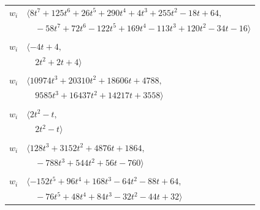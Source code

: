 \documentclass[11pt]{article}
\begin{document}
\begin{longtable}{@{}ll@{}}
$w_i$ & $\langle 8t^{7}+125t^{6}+26t^{5}+290t^{4}+4t^{3}+255t^{2}-18t+64,$\\
 & $\quad -58t^{7}+72t^{6}-122t^{5}+169t^{4}-113t^{3}+120t^{2}-34t-16\rangle$\\
\addlinespace[2pt]
\multicolumn{2}{@{}p{0.97\textwidth}@{}}{$i=44$, $D_i=2$, $\rho_{ij}$: $26{:}1, \allowbreak 36{:}1, \allowbreak 37{:}2, \allowbreak 43{:}2, \allowbreak 45{:}1, \allowbreak 48{:}1, \allowbreak 61{:}2$}\\
$w_i$ & $\langle -4t+4,$\\
 & $\quad 2t^{2}+2t+4\rangle$\\
\addlinespace[2pt]
\multicolumn{2}{@{}p{0.97\textwidth}@{}}{$i=45$, $D_i=32$, $\rho_{ij}$: $3{:}1, \allowbreak 7{:}2, \allowbreak 8{:}2, \allowbreak 14{:}1, \allowbreak 17{:}1, \allowbreak 24{:}1, \allowbreak 26{:}2, \allowbreak 27{:}2, \allowbreak 34{:}2, \allowbreak 40{:}2, \allowbreak 44{:}2, \allowbreak 59{:}1, \allowbreak 71{:}2, \allowbreak 72{:}2$}\\
$w_i$ & $\langle 10974t^{3}+20310t^{2}+18606t+4788,$\\
 & $\quad 9585t^{3}+16437t^{2}+14217t+3558\rangle$\\
\addlinespace[2pt]
\multicolumn{2}{@{}p{0.97\textwidth}@{}}{$i=46$, $D_i=1$, $\rho_{ij}$: $23{:}2, \allowbreak 38{:}1$}\\
$w_i$ & $\langle 2t^{2}-t,$\\
 & $\quad 2t^{2}-t\rangle$\\
\addlinespace[2pt]
\multicolumn{2}{@{}p{0.97\textwidth}@{}}{$i=47$, $D_i=4$, $\rho_{ij}$: $1{:}2, \allowbreak 4{:}1, \allowbreak 10{:}2, \allowbreak 13{:}2, \allowbreak 17{:}1, \allowbreak 37{:}2, \allowbreak 49{:}2, \allowbreak 50{:}2, \allowbreak 52{:}1, \allowbreak 54{:}1, \allowbreak 66{:}2, \allowbreak 68{:}2$}\\
$w_i$ & $\langle 128t^{3}+3152t^{2}+4876t+1864,$\\
 & $\quad -788t^{3}+544t^{2}+56t-760\rangle$\\
\addlinespace[2pt]
\multicolumn{2}{@{}p{0.97\textwidth}@{}}{$i=48$, $D_i=4$, $\rho_{ij}$: $0{:}1, \allowbreak 1{:}1, \allowbreak 4{:}2, \allowbreak 5{:}1, \allowbreak 11{:}2, \allowbreak 14{:}2, \allowbreak 24{:}1, \allowbreak 44{:}2, \allowbreak 50{:}1, \allowbreak 51{:}1, \allowbreak 56{:}2, \allowbreak 71{:}1$}\\
$w_i$ & $\langle -152t^{5}+96t^{4}+168t^{3}-64t^{2}-88t+64,$\\
 & $\quad -76t^{5}+48t^{4}+84t^{3}-32t^{2}-44t+32\rangle$\\

\end{longtable}
\end{document}
